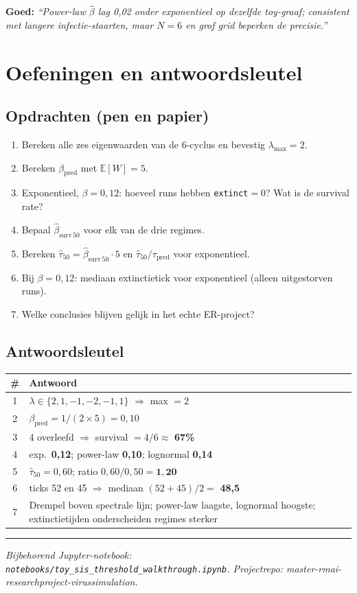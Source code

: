 \documentclass[11pt,a4paper]{article}
\begin{document}
\textbf{Goed:} \emph{``Power-law $\hat\beta$ lag 0,02 onder exponentieel op dezelfde toy-graaf; consistent met langere infectie-staarten, maar $N{=}6$ en grof grid beperken de precisie.''}

\section*{Oefeningen en antwoordsleutel}

\subsection*{Opdrachten (pen en papier)}
\begin{enumerate}[leftmargin=*]
  \item Bereken alle zes eigenwaarden van de 6-cyclus en bevestig $\lambda_{\max}=2$.
  \item Bereken $\beta_{\mathrm{pred}}$ met $\mathbb{E}[W]=5$.
  \item Exponentieel, $\beta=0{,}12$: hoeveel runs hebben \texttt{extinct}$=0$? Wat is de survival rate?
  \item Bepaal $\hat\beta_{\mathrm{surv}\,50}$ voor elk van de drie regimes.
  \item Bereken $\hat\tau_{50} = \hat\beta_{\mathrm{surv}\,50} \cdot 5$ en $\hat\tau_{50}/\tau_{\mathrm{pred}}$ voor exponentieel.
  \item Bij $\beta=0{,}12$: mediaan extinctietick voor exponentieel (alleen uitgestorven runs).
  \item Welke conclusies blijven gelijk in het echte ER-project?
\end{enumerate}

\subsection*{Antwoordsleutel}
\begin{center}
\begin{tabular}{@{}cl@{}}
\toprule
\# & Antwoord \\
\midrule
1 & $\lambda \in \{2, 1, -1, -2, -1, 1\}$ $\Rightarrow$ max $= 2$ \\
2 & $\beta_{\mathrm{pred}} = 1/(2 \times 5) = 0{,}10$ \\
3 & 4 overleefd $\Rightarrow$ survival $= 4/6 \approx$ \textbf{67\%} \\
4 & exp.\ \textbf{0,12}; power-law \textbf{0,10}; lognormal \textbf{0,14} \\
5 & $\hat\tau_{50} = 0{,}60$; ratio $0{,}60/0{,}50 = \mathbf{1{,}20}$ \\
6 & ticks 52 en 45 $\Rightarrow$ mediaan $(52+45)/2 =$ \textbf{48,5} \\
7 & Drempel boven spectrale lijn; power-law laagste, lognormal hoogste; extinctietijden onderscheiden regimes sterker \\
\bottomrule
\end{tabular}
\end{center}

\vspace{1em}
\hrule
\vspace{0.5em}
\small
\textit{Bijbehorend Jupyter-notebook: \texttt{notebooks/toy\_sis\_threshold\_walkthrough.ipynb}. Projectrepo: master-rmai-researchproject-virussimulation.}
\end{document}
